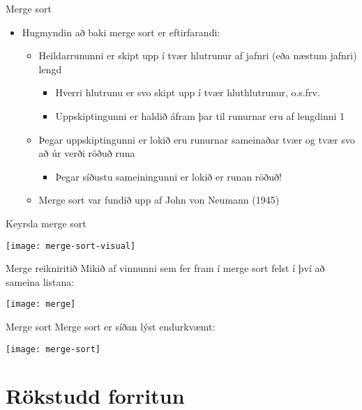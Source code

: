 \documentclass[handout]{beamer}
\begin{document}
\begin{frame}{Merge sort}
\begin{itemize}
 \item Hugmyndin að baki merge sort er eftirfarandi:
 \begin{itemize}
  \item Heildarrununni er skipt upp í tvær hlutrunur af jafnri (eða næstum jafnri) lengd
  \begin{itemize}
   \item Hverri hlutrunu er svo skipt upp í tvær hluthlutrunur, o.s.frv.
   \item Uppskiptingunni er haldið áfram þar til runurnar eru af lengdinni 1
  \end{itemize}
  \item Þegar uppskiptingunni er lokið eru runurnar sameinaðar tvær og tvær svo að úr verði röðuð runa
  \begin{itemize}
   \item Þegar síðustu sameiningunni er lokið er runan röðuð!
  \end{itemize}
  \item Merge sort var fundið upp af John von Neumann (1945)
 \end{itemize}
\end{itemize}
\end{frame}

\begin{frame}{Keyrsla merge sort}
\vspace{0.5cm}
\begin{center}
\texttt{[image: merge-sort-visual]}
\end{center}
\end{frame}

\begin{frame}{Merge reikniritið}
Mikið af vinnunni sem fer fram í merge sort felst í því að sameina listana:
\begin{center}
\texttt{[image: merge]}
\end{center}
\end{frame}

\begin{frame}{Merge sort}
Merge sort er síðan lýst endurkvæmt:
\begin{center}
\texttt{[image: merge-sort]}
\end{center}
\end{frame}

\section{Rökstudd forritun}
\end{document}

